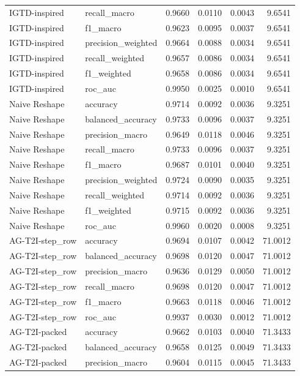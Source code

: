 \begin{tabular}{llrrrr}
IGTD-inspired & recall_macro & 0.9660 & 0.0110 & 0.0043 & 9.6541 \\
IGTD-inspired & f1_macro & 0.9623 & 0.0095 & 0.0037 & 9.6541 \\
IGTD-inspired & precision_weighted & 0.9664 & 0.0088 & 0.0034 & 9.6541 \\
IGTD-inspired & recall_weighted & 0.9657 & 0.0086 & 0.0034 & 9.6541 \\
IGTD-inspired & f1_weighted & 0.9658 & 0.0086 & 0.0034 & 9.6541 \\
IGTD-inspired & roc_auc & 0.9950 & 0.0025 & 0.0010 & 9.6541 \\
Naive Reshape & accuracy & 0.9714 & 0.0092 & 0.0036 & 9.3251 \\
Naive Reshape & balanced_accuracy & 0.9733 & 0.0096 & 0.0037 & 9.3251 \\
Naive Reshape & precision_macro & 0.9649 & 0.0118 & 0.0046 & 9.3251 \\
Naive Reshape & recall_macro & 0.9733 & 0.0096 & 0.0037 & 9.3251 \\
Naive Reshape & f1_macro & 0.9687 & 0.0101 & 0.0040 & 9.3251 \\
Naive Reshape & precision_weighted & 0.9724 & 0.0090 & 0.0035 & 9.3251 \\
Naive Reshape & recall_weighted & 0.9714 & 0.0092 & 0.0036 & 9.3251 \\
Naive Reshape & f1_weighted & 0.9715 & 0.0092 & 0.0036 & 9.3251 \\
Naive Reshape & roc_auc & 0.9960 & 0.0020 & 0.0008 & 9.3251 \\
AG-T2I-step_row & accuracy & 0.9694 & 0.0107 & 0.0042 & 71.0012 \\
AG-T2I-step_row & balanced_accuracy & 0.9698 & 0.0120 & 0.0047 & 71.0012 \\
AG-T2I-step_row & precision_macro & 0.9636 & 0.0129 & 0.0050 & 71.0012 \\
AG-T2I-step_row & recall_macro & 0.9698 & 0.0120 & 0.0047 & 71.0012 \\
AG-T2I-step_row & f1_macro & 0.9663 & 0.0118 & 0.0046 & 71.0012 \\
AG-T2I-step_row & roc_auc & 0.9937 & 0.0030 & 0.0012 & 71.0012 \\
AG-T2I-packed & accuracy & 0.9662 & 0.0103 & 0.0040 & 71.3433 \\
AG-T2I-packed & balanced_accuracy & 0.9658 & 0.0125 & 0.0049 & 71.3433 \\
AG-T2I-packed & precision_macro & 0.9604 & 0.0115 & 0.0045 & 71.3433 \\

\end{tabular}
